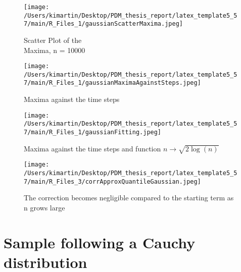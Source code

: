 \begin{figure}[h!]
	\centering
	\begin{minipage}[b]{0.4\textwidth}
        \centering
        \texttt{[image: /Users/kimartin/Desktop/PDM\_thesis\_report/latex\_template5\_57/main/R\_Files\_1/gaussianScatterMaxima.jpeg]}
        \caption{Scatter Plot of the \\Maxima, n = 10000}
        \label{fig:toyingLimitGaussianScatter}
	\end{minipage}
	\begin{minipage}[b]{0.4\textwidth}
		        \centering
		        \texttt{[image: /Users/kimartin/Desktop/PDM\_thesis\_report/latex\_template5\_57/main/R\_Files\_1/gaussianMaximaAgainstSteps.jpeg]}
		        \caption{Maxima against the time steps}
		        \label{fig:toyingLimitGaussianAgainst}
	\end{minipage}
 \end{figure}
 \begin{figure}[h!]
       \centering
       \texttt{[image: /Users/kimartin/Desktop/PDM\_thesis\_report/latex\_template5\_57/main/R\_Files\_1/gaussianFitting.jpeg]}
       \caption{Maxima against the time steps and function $n \rightarrow \sqrt{2 \log(n)}$}
       \label{fig:toyingLimitGaussianFitting}
\end{figure}
 \begin{figure}[h!]
 	\centering
 	\texttt{[image: /Users/kimartin/Desktop/PDM\_thesis\_report/latex\_template5\_57/main/R\_Files\_3/corrApproxQuantileGaussian.jpeg]}
 	\caption{The correction becomes negligible compared to the starting term as n grows large}
 	\label{fig:toyingLimitGaussianCorr}
 \end{figure}
\section{Sample following a Cauchy distribution}

